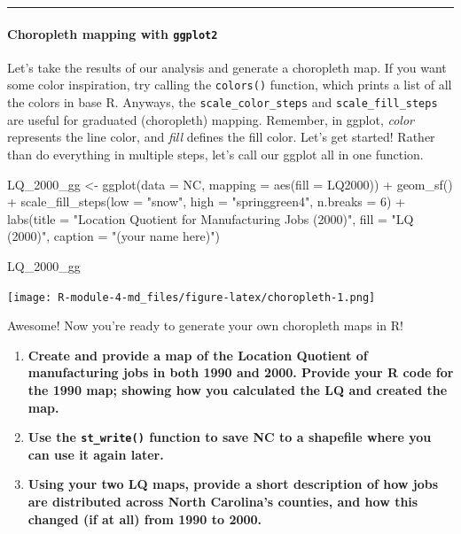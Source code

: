 \documentclass[
]{article}
\newenvironment{Shaded}{\begin{snugshade}}{\end{snugshade}}
\newcommand{\AttributeTok}[1]{\textcolor[rgb]{0.77,0.63,0.00}{#1}}
\newcommand{\DecValTok}[1]{\textcolor[rgb]{0.00,0.00,0.81}{#1}}
\newcommand{\FunctionTok}[1]{\textcolor[rgb]{0.00,0.00,0.00}{#1}}
\newcommand{\NormalTok}[1]{#1}
\newcommand{\OtherTok}[1]{\textcolor[rgb]{0.56,0.35,0.01}{#1}}
\newcommand{\SpecialCharTok}[1]{\textcolor[rgb]{0.00,0.00,0.00}{#1}}
\newcommand{\StringTok}[1]{\textcolor[rgb]{0.31,0.60,0.02}{#1}}
\begin{document}
\begin{center}\rule{0.5\linewidth}{0.5pt}\end{center}

\hypertarget{choropleth-mapping-with-ggplot2}{%
\paragraph{\texorpdfstring{Choropleth mapping with
\texttt{ggplot2}}{Choropleth mapping with ggplot2}}\label{choropleth-mapping-with-ggplot2}}

Let's take the results of our analysis and generate a choropleth map. If
you want some color inspiration, try calling the \texttt{colors()}
function, which prints a list of all the colors in base R. Anyways, the
\texttt{scale\_color\_steps} and \texttt{scale\_fill\_steps} are useful
for graduated (choropleth) mapping. Remember, in ggplot, \emph{color}
represents the line color, and \emph{fill} defines the fill color. Let's
get started! Rather than do everything in multiple steps, let's call our
ggplot all in one function.

\begin{Shaded}
\begin{Highlighting}[]
\NormalTok{LQ\_2000\_gg }\OtherTok{\textless{}{-}} \FunctionTok{ggplot}\NormalTok{(}\AttributeTok{data =}\NormalTok{ NC, }\AttributeTok{mapping =} \FunctionTok{aes}\NormalTok{(}\AttributeTok{fill =}\NormalTok{ LQ2000)) }\SpecialCharTok{+}
  \FunctionTok{geom\_sf}\NormalTok{() }\SpecialCharTok{+}
  \FunctionTok{scale\_fill\_steps}\NormalTok{(}\AttributeTok{low =} \StringTok{"snow"}\NormalTok{,}
                   \AttributeTok{high =} \StringTok{"springgreen4"}\NormalTok{,}
                   \AttributeTok{n.breaks =} \DecValTok{6}\NormalTok{) }\SpecialCharTok{+}
  \FunctionTok{labs}\NormalTok{(}\AttributeTok{title =} \StringTok{"Location Quotient for Manufacturing Jobs (2000)"}\NormalTok{,}
       \AttributeTok{fill =} \StringTok{"LQ (2000)"}\NormalTok{,}
       \AttributeTok{caption =} \StringTok{"(your name here)"}\NormalTok{)}

\NormalTok{LQ\_2000\_gg}
\end{Highlighting}
\end{Shaded}

\texttt{[image: R-module-4-md\_files/figure-latex/choropleth-1.png]}

Awesome! Now you're ready to generate your own choropleth maps in R!

\begin{enumerate}
\def\labelenumi{\arabic{enumi}.}
\setcounter{enumi}{1}
\item
  \textbf{Create and provide a map of the Location Quotient of
  manufacturing jobs in both 1990 and 2000. Provide your R code for the
  1990 map; showing how you calculated the LQ and created the map.}
\item
  \textbf{Use the \texttt{st\_write()} function to save NC to a
  shapefile where you can use it again later.}
\item
  \textbf{Using your two LQ maps, provide a short description of how
  jobs are distributed across North Carolina's counties, and how this
  changed (if at all) from 1990 to 2000.}
\end{enumerate}
\end{document}
